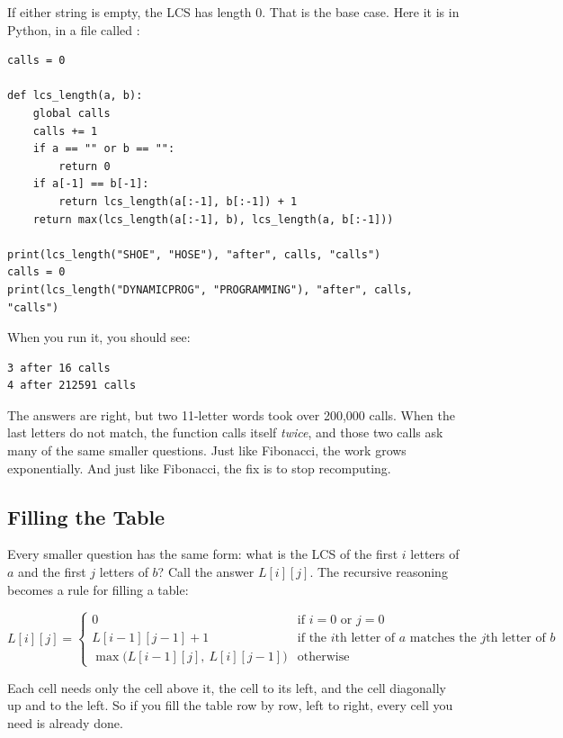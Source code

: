 If either string is empty, the LCS has length 0. That is the base case. Here it is in Python, in a file
called :

\begin{verbatim}
calls = 0

def lcs_length(a, b):
    global calls
    calls += 1
    if a == "" or b == "":
        return 0
    if a[-1] == b[-1]:
        return lcs_length(a[:-1], b[:-1]) + 1
    return max(lcs_length(a[:-1], b), lcs_length(a, b[:-1]))

print(lcs_length("SHOE", "HOSE"), "after", calls, "calls")
calls = 0
print(lcs_length("DYNAMICPROG", "PROGRAMMING"), "after", calls, "calls")
\end{verbatim}

When you run it, you should see:
\begin{verbatim}
3 after 16 calls
4 after 212591 calls
\end{verbatim}

The answers are right, but two 11-letter words took over 200,000 calls. When the last letters do not match,
the function calls itself \emph{twice}, and those two calls ask many of the same smaller questions. Just
like Fibonacci, the work grows exponentially. And just like Fibonacci, the fix is to stop recomputing.

\subsection{Filling the Table}
Every smaller question has the same form: what is the LCS of the first $i$ letters of $a$ and the first $j$
letters of $b$? Call the answer $L[i][j]$. The recursive reasoning becomes a rule for filling a table:

\begin{mdframed}[style = important, frametitle = {The LCS Recurrence}]
$$L[i][j] = \begin{cases}
0 & \text{if } i = 0 \text{ or } j = 0\\
L[i-1][j-1] + 1 & \text{if the } i\text{th letter of } a \text{ matches the } j\text{th letter of } b\\
\max\big(L[i-1][j],\ L[i][j-1]\big) & \text{otherwise}
\end{cases}$$
\end{mdframed}

Each cell needs only the cell above it, the cell to its left, and the cell diagonally up and to the left. So
if you fill the table row by row, left to right, every cell you need is already done.

